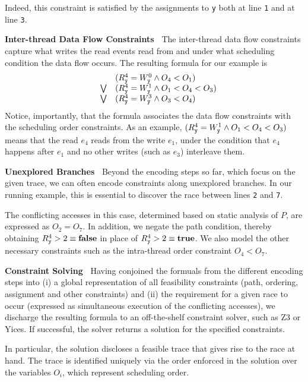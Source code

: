 Indeed, this constraint is satisfied by the assignments to {\tt y} both at line {\tt 1} and at line {\tt 3}.


{\bf Inter-thread Data Flow Constraints\ } The inter-thread data flow constraints capture what writes the read events read from and under what scheduling condition the data flow occurs.  The resulting formula for our example is
$$
\begin{array}{lcl}
	& & (R_{\tt y}^4=W_{\tt y}^0 \wedge O_4 < O_1)  \\
& \bigvee &
	(R_{\tt y}^4=W_{\tt y}^1 \wedge O_1 < O_4 < O_3) \\
& \bigvee &
	(R_{\tt y}^4=W_{\tt y}^3 \wedge O_3 < O_4)
\end{array}
$$    
Notice, importantly, that the formula associates the data flow constraints with the scheduling order constraints. 
 As an example, 
$(R_{\tt y}^4=W_{\tt y}^1 \wedge O_1 < O_4 < O_3)$ means that the read $e_4$ reads from the write $e_1$, under the condition that $e_4$ happens after $e_1$ and no other     writes (such as $e_3$) interleave them.



{\bf Unexplored Branches\ } Beyond the encoding steps so far, which focus on the given trace, we can often encode constraints along unexplored branches. In our running example, this is essential to discover the race between lines {\tt 2} and {\tt 7}. 

The conflicting accesses in this case, determined based on static analysis of $P$, are expressed as $O_2=O_7$. In addition, we negate the path condition, thereby obtaining $R_{\tt y}^4 > 2 \equiv {\bf false}$ in place of $R_{\tt y}^4 > 2 \equiv {\bf true}$. We also model the other necessary constraints such as the intra-thread order constraint $O_4 < O_7$.

{\bf Constraint Solving\ } Having conjoined the formuals from the different encoding steps into (i) a global representation of all feasibility constraints (path, ordering, assignment and other constraints) and (ii) the requirement for a given race to occur (expressed as simultaneous execution of the conflicting accesses), we discharge the resulting formula to an off-the-shelf constraint solver, such as Z3 or Yices. If successful, the solver returns a solution for the specified constraints. 

In particular, the solution discloses a feasible trace that gives rise to the race at hand. The trace is identified uniquely via the order enforced in the solution over the variables $O_i$, which represent scheduling order. 
